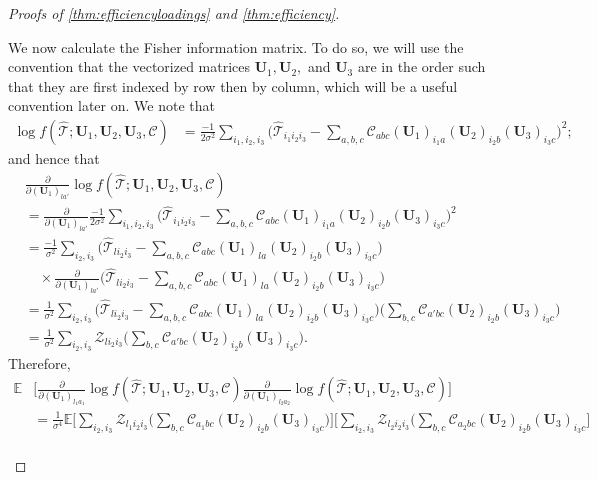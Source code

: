 \documentclass[10pt]{article}
\newcommand{\0}{{\mathbf{0}}}
\newcommand{\1}{{\mathbf{1}}}
\newcommand{\E}{{\mathbf{E}}}
\newcommand{\U}{{\mathbf{U}}}
\renewcommand{\E}{\mathbb{E}}
\newcommand{\del}{\partial}
\renewcommand{\hat}{\widehat}
\renewcommand{\hat}{\widehat}
\begin{document}
\begin{proof}[Proofs of \cref{thm:efficiencyloadings} and \cref{thm:efficiency}]
\begin{itemize}
We now calculate the Fisher information matrix.  To do so, we will use the convention that the vectorized matrices $\U_1, \U_2,$ and $\U_3$ are in the order such that they are first indexed by row then by column, which will be a useful convention later on. We note that
\begin{align*}
\log f( \mathcal{\hat T}; \U_1, \U_2, \U_3, \mathcal{C} ) &=\frac{-1}{2\sigma^2} \sum_{i_1,i_2,i_3} \bigg( \mathcal{\hat T}_{i_1 i_2 i_3} - \sum_{a,b,c} \mathcal{C}_{abc} (\U_1)_{i_1 a} (\U_2)_{i_2 b} (\U_3 )_{i_3 c} \bigg)^2; 
\end{align*}
and hence that
\begin{align*}
    &\frac{\del }{\del (\U_1)_{l a'}}\log f( \mathcal{\hat T}; \U_1, \U_2, \U_3, \mathcal{C} )  \\
&= \frac{\del }{\del (\U_1)_{l a'}}\frac{-1}{2\sigma^2} \sum_{i_1,i_2,i_3} \bigg( \mathcal{\hat T}_{i_1 i_2 i_3} - \sum_{a,b,c} \mathcal{C}_{abc} (\U_1)_{i_1 a} (\U_2)_{i_2 b} (\U_3 )_{i_3 c} \bigg)^2 \\
&= \frac{-1}{\sigma^2} \sum_{i_2,i_3} \bigg( \mathcal{\hat T}_{l i_2 i_3} - \sum_{a,b,c} \mathcal{C}_{abc} (\U_1)_{l a} (\U_2)_{i_2 b} (\U_3 )_{i_3 c}  \bigg)\\
&\quad \times \frac{\del}{\del(\U_1)_{la'}} \bigg( \mathcal{\hat T}_{l i_2 i_3} - \sum_{a,b,c} \mathcal{C}_{abc} (\U_1)_{l a} (\U_2)_{i_2 b} (\U_3 )_{i_3 c}  \bigg)  \\
&= \frac{1}{\sigma^2} \sum_{i_2,i_3} \bigg( \mathcal{\hat T}_{l i_2 i_3} - \sum_{a,b,c} \mathcal{C}_{abc} (\U_1)_{l a} (\U_2)_{i_2 b} (\U_3 )_{i_3 c}  \bigg)  \bigg( \sum_{b,c} \mathcal{C}_{a' bc} (\U_2)_{i_2 b} (\U_3 )_{i_3 c}  \bigg)  \\
&= \frac{1}{\sigma^2} \sum_{i_2, i_3} \mathcal{Z}_{l i_2 i_3}   \bigg( \sum_{b,c} \mathcal{C}_{a' bc} (\U_2)_{i_2 b} (\U_3 )_{i_3 c}  \bigg).
\end{align*}
Therefore,\begin{align}
\E &\Bigg[  \frac{\del }{\del (\U_1)_{l_1 a_1}}\log f( \mathcal{\hat T}; \U_1, \U_2, \U_3, \mathcal{C} ) \frac{\del }{\del (\U_1)_{l_2 a_2}}\log f( \mathcal{\hat T}; \U_1, \U_2, \U_3, \mathcal{C} ) \Bigg] \nonumber \\
&= \frac{1}{\sigma^4} \E \Bigg[ \sum_{i_2, i_3} \mathcal{Z}_{l_1 i_2 i_3}   \bigg( \sum_{b,c} \mathcal{C}_{a_1 bc} (\U_2)_{i_2 b} (\U_3 )_{i_3 c}  \bigg) \Bigg] \Bigg[  \sum_{i_2, i_3} \mathcal{Z}_{l_2 i_2 i_3}   \bigg( \sum_{b,c} \mathcal{C}_{a_2 bc} (\U_2)_{i_2 b} (\U_3 )_{i_3 c} \Bigg] \nonumber \\

\end{align}
\end{itemize}
\end{proof}
\end{document}
